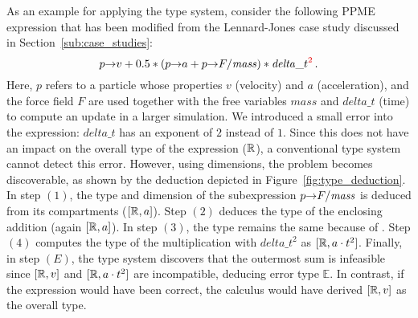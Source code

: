     As an example for applying the type system, consider the following PPME expression
    that has been modified from the Lennard-Jones case study discussed in
    Section~\ref{sub:case_studies}:
     \[ \arrowOp{p}{v} + 0.5 * (\arrowOp{p}{a} + \arrowOp{p}{F} / \mathit{mass}) * {\mathit{delta}\_t}^{\color{red!90!black}2} \, . \]
    Here, $p$ refers to a particle whose properties $v$ (velocity) and $a$ (acceleration),
    and the force field $F$ are used together with the free variables $\mathit{mass}$ and $\mathit{delta}\_t$ (time)
    to compute an update in a larger simulation. We introduced a small error into the expression: $\mathit{delta}\_t$ has an
    exponent of $2$ instead of $1$. Since this does not have an impact on the overall type of the expression ($\mathit{\mathbb{R}}$),
    a conventional type system cannot detect this error. However, using dimensions, the problem becomes discoverable, as shown
    by the deduction depicted in Figure~\ref{fig:type_deduction}. In step $(1)$, the type and dimension of the subexpression
    $p{\to}F / \mathit{mass}$ is deduced from its compartments ($[\mathbb{R}, a]$).
    Step $(2)$ deduces the type of the enclosing addition 
    (again $[\mathbb{R}, a]$).
    In step $(3)$, the type remains the same because of .
    Step $(4)$ computes the type of the multiplication with ${\mathit{delta}\_t}^2$ as $[\mathbb{R}, a \cdot t^2]$. Finally, in step
    $(E)$, the type system discovers that the outermost sum is infeasible since  $[\mathbb{R}, v]$ and $[\mathbb{R}, a \cdot t^2]$ are incompatible,
    deducing error type $\mathbb{E}$. In contrast, if the expression would have been correct, the calculus would have
    derived $[\mathbb{R}, v]$ as the overall type.

